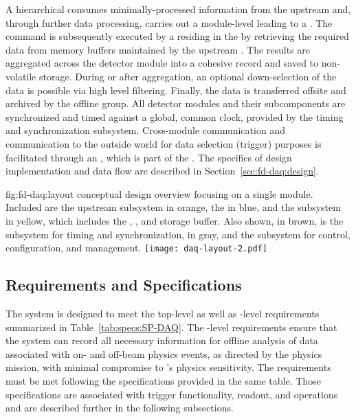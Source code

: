 A
hierarchical  consumes minimally-processed
information from the upstream  and, through further data processing, 
carries out a module-level  leading to a .
The command is subsequently executed by a  residing in the 
by retrieving the required data from memory buffers maintained by the upstream .
The results are aggregated across the detector module into a cohesive record and saved to non-volatile storage.
During or after aggregation, an optional down-selection of the data is possible via
high level filtering.
Finally, the data is  transferred offsite and archived by the  offline group.
All
detector modules and their subcomponents are synchronized and timed against a global,
common clock, provided by the timing and synchronization
subsystem. Cross-module communication and communication
to the outside world for data selection (trigger) purposes is facilitated
through an , which is part of the . The
specifics of design implementation and data flow are described in Section~\ref{sec:fd-daq:design}.

\begin{dunefigure}{fig:fd-daq:layout}{ conceptual design overview focusing
    on a single \nominalmodsize module. Included are the upstream
     subsystem in orange, the  in
    blue, and the  subsystem in yellow,
    which includes the , , and storage buffer. 
    Also shown, in brown, is the subsystem for timing and
    synchronization, in gray, and the subsystem for control,
    configuration, and management.
  }
  \texttt{[image: daq-layout-2.pdf]}
\end{dunefigure}


\subsection{Requirements and Specifications}
\label{sec:fd-daq:requirements}

The    system is designed to meet the
 top-level as well as -level requirements
summarized in Table~\ref{tab:specs:SP-DAQ}. The -level requirements ensure that the 
system
can record all necessary information for offline 
analysis of data associated with on- and off-beam physics events, as directed
by the  physics mission, with minimal compromise to
's physics sensitivity. The requirements must be met following the 
specifications provided in the same table.
Those specifications are
associated with trigger functionality, readout,
and operations and are described further in the following subsections.

